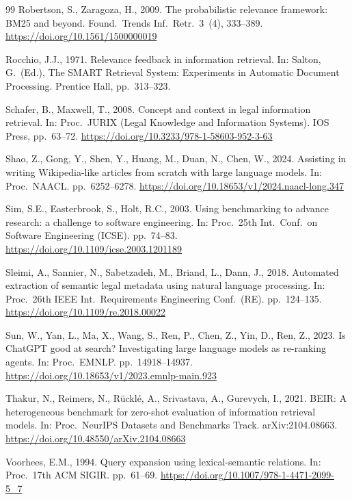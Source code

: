 \documentclass[a4paper,fleqn]{cas-sc}
\begin{document}
\begin{thebibliography}{99}
Robertson, S., Zaragoza, H., 2009. The probabilistic relevance framework: BM25 and beyond. Found.\ Trends Inf.\ Retr.\ 3~(4), 333--389. \url{https://doi.org/10.1561/1500000019}

Rocchio, J.J., 1971. Relevance feedback in information retrieval. In: Salton, G.\ (Ed.), The SMART Retrieval System: Experiments in Automatic Document Processing. Prentice Hall, pp.\ 313--323.

Schafer, B., Maxwell, T., 2008. Concept and context in legal information retrieval. In: Proc.\ JURIX (Legal Knowledge and Information Systems). IOS Press, pp.\ 63--72. \url{https://doi.org/10.3233/978-1-58603-952-3-63}

Shao, Z., Gong, Y., Shen, Y., Huang, M., Duan, N., Chen, W., 2024. Assisting in writing Wikipedia-like articles from scratch with large language models. In: Proc.\ NAACL. pp.\ 6252--6278. \url{https://doi.org/10.18653/v1/2024.naacl-long.347}

Sim, S.E., Easterbrook, S., Holt, R.C., 2003. Using benchmarking to advance research: a challenge to software engineering. In: Proc.\ 25th Int.\ Conf.\ on Software Engineering (ICSE). pp.\ 74--83. \url{https://doi.org/10.1109/icse.2003.1201189}

Sleimi, A., Sannier, N., Sabetzadeh, M., Briand, L., Dann, J., 2018. Automated extraction of semantic legal metadata using natural language processing. In: Proc.\ 26th IEEE Int.\ Requirements Engineering Conf.\ (RE). pp.\ 124--135. \url{https://doi.org/10.1109/re.2018.00022}

Sun, W., Yan, L., Ma, X., Wang, S., Ren, P., Chen, Z., Yin, D., Ren, Z., 2023. Is ChatGPT good at search? Investigating large language models as re-ranking agents. In: Proc.\ EMNLP. pp.\ 14918--14937. \url{https://doi.org/10.18653/v1/2023.emnlp-main.923}

Thakur, N., Reimers, N., R\"uckl\'e, A., Srivastava, A., Gurevych, I., 2021. BEIR: A heterogeneous benchmark for zero-shot evaluation of information retrieval models. In: Proc.\ NeurIPS Datasets and Benchmarks Track. arXiv:2104.08663. \url{https://doi.org/10.48550/arXiv.2104.08663}

Voorhees, E.M., 1994. Query expansion using lexical-semantic relations. In: Proc.\ 17th ACM SIGIR. pp.\ 61--69. \url{https://doi.org/10.1007/978-1-4471-2099-5_7}


\end{thebibliography}
\end{document}

